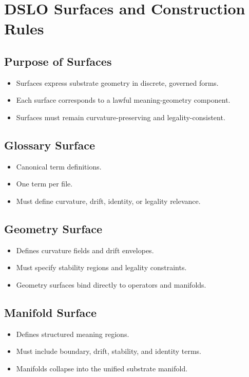 \section{DSLO Surfaces and Construction Rules}

\subsection{Purpose of Surfaces}
\begin{itemize}
    \item Surfaces express substrate geometry in discrete, governed forms.
    \item Each surface corresponds to a lawful meaning-geometry component.
    \item Surfaces must remain curvature-preserving and legality-consistent.
\end{itemize}

\subsection{Glossary Surface}
\begin{itemize}
    \item Canonical term definitions.
    \item One term per file.
    \item Must define curvature, drift, identity, or legality relevance.
\end{itemize}

\subsection{Geometry Surface}
\begin{itemize}
    \item Defines curvature fields and drift envelopes.
    \item Must specify stability regions and legality constraints.
    \item Geometry surfaces bind directly to operators and manifolds.
\end{itemize}

\subsection{Manifold Surface}
\begin{itemize}
    \item Defines structured meaning regions.
    \item Must include boundary, drift, stability, and identity terms.
    \item Manifolds collapse into the unified substrate manifold.
\end{itemize}

